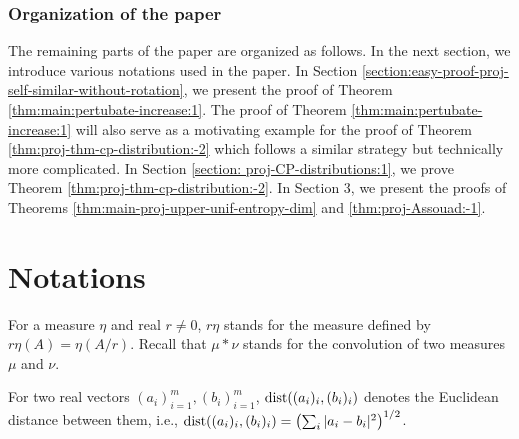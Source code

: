 \documentclass[a4paper,11pt]{amsart}
\newtheorem{theorem}{Theorem}[section]
\theoremstyle{definition}
\numberwithin{equation}{section}
\def\R{\mathbb R}
\DeclareMathOperator{\dist}{{\rm dist}}
\begin{document}

\subsubsection{Organization of the paper}
The remaining parts of the paper are organized as follows. In the next section, we introduce various notations used in the paper. In Section \ref{section:easy-proof-proj-self-similar-without-rotation}, we present the proof of Theorem \ref{thm:main:pertubate-increase:1}. 
The proof of Theorem \ref{thm:main:pertubate-increase:1} will also serve as a motivating example for the proof of Theorem \ref{thm:proj-thm-cp-distribution:-2} which follows a similar strategy but technically more complicated.
In Section \ref{section: proj-CP-distributions:1}, we prove Theorem \ref{thm:proj-thm-cp-distribution:-2}. In Section 3, we present the proofs of Theorems \ref{thm:main-proj-upper-unif-entropy-dim} and \ref{thm:proj-Assouad:-1}.


\section{Notations}\label{section:notation}
For a measure $\eta$ and real $r\neq 0$, $r\eta$ stands for the measure defined
by $r\eta(A)=\eta(A/r)$. 
Recall that $\mu*\nu$ stands for the convolution of two measures $\mu$ and $\nu$.  

For two real vectors $(a_i)_{i=1}^m,   (b_i)_{i=1}^m$,  $\dist((a_i)_i,(b_i)_i)$ denotes the Euclidean distance between them,  i.e.,  
$\dist((a_i)_i,(b_i)_i)=\left(\sum_i|a_i-b_i|^2\right)^{1/2}$. 
\end{document}

